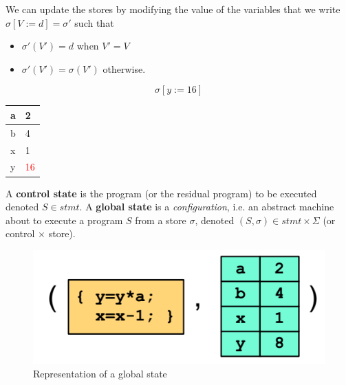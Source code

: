\documentclass[12pt, a4paper]{book}
\begin{document}
We can update the stores by modifying the value of the variables that we
write $\sigma[V := d] = \sigma'$ such that

\begin{itemize}
    \item $\sigma'(V') = d$ when $V' =V$
    \item $\sigma'(V') = \sigma(V')$ otherwise.
\end{itemize}

\begin{minipage}{\linewidth}
    \begin{minipage}{0.4\linewidth}
        $$\sigma[y := 16]$$
    \end{minipage}
    \begin{minipage}{0.4\linewidth}
        \centering
        \begin{tabular}{ll}
            \toprule
            a & 2 \\
            \midrule
            b & 4 \\
            \midrule
            x & 1 \\
            \midrule
            y & \textcolor{red}{16} \\
            \bottomrule
        \end{tabular}
    \end{minipage}
\end{minipage}

A \textbf{control state} is the program (or the residual program) to be executed
denoted $S \in stmt$. A \textbf{global state} is a \textit{configuration}, i.e.
an abstract machine about to execute a program $S$ from a store $\sigma$,
denoted $(S,\sigma) \in stmt \times \Sigma$ (or control $\times$ store).

\begin{figure}[!ht]
    \centering
    \includegraphics[width=\linewidth]{global_state.png}
    \caption{Representation of a global state}
\end{figure}
\end{document}
